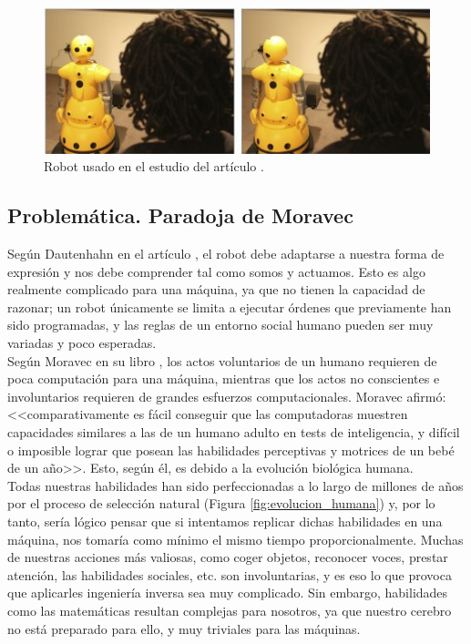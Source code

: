 \begin{figure} [h!]
  \begin{center}
    \includegraphics[width=13cm]{figs/hri_distancing.jpg}
  \end{center}
  \caption{Robot usado en el estudio del artículo \cite{hri_distancing}.}
  \label{fig:hri_distancing}
\end{figure}

\subsection{Problemática. Paradoja de Moravec}

Según Dautenhahn en el artículo \cite{hri_dautenhahn}, el robot debe adaptarse a nuestra forma de expresión y nos debe comprender tal como somos y actuamos. Esto es algo realmente complicado para una máquina, ya que no tienen la capacidad de razonar; un robot únicamente se limita a ejecutar órdenes que previamente han sido programadas, y las reglas de un entorno social humano pueden ser muy variadas y poco esperadas.\\

Según Moravec en su libro \cite{moravec}, los actos voluntarios de un humano requieren de poca computación para una máquina, mientras que los actos no conscientes e involuntarios requieren de grandes esfuerzos computacionales. Moravec afirmó: <<comparativamente es fácil conseguir que las computadoras muestren capacidades similares a las de un humano adulto en tests de inteligencia, y difícil o imposible lograr que posean las habilidades perceptivas y motrices de un bebé de un año>>. Esto, según él, es debido a la evolución biológica humana.\\

Todas nuestras habilidades han sido perfeccionadas a lo largo de millones de años por el proceso de selección natural (Figura \ref{fig:evolucion_humana}) y, por lo tanto, sería lógico pensar que si intentamos replicar dichas habilidades en una máquina, nos tomaría como mínimo el mismo tiempo proporcionalmente. Muchas de nuestras acciones más valiosas, como coger objetos, reconocer voces, prestar atención, las habilidades sociales, etc. son involuntarias, y es eso lo que provoca que aplicarles ingeniería inversa sea muy complicado. Sin embargo, habilidades como las matemáticas resultan complejas para nosotros, ya que nuestro cerebro no está preparado para ello, y muy triviales para las máquinas.\\

